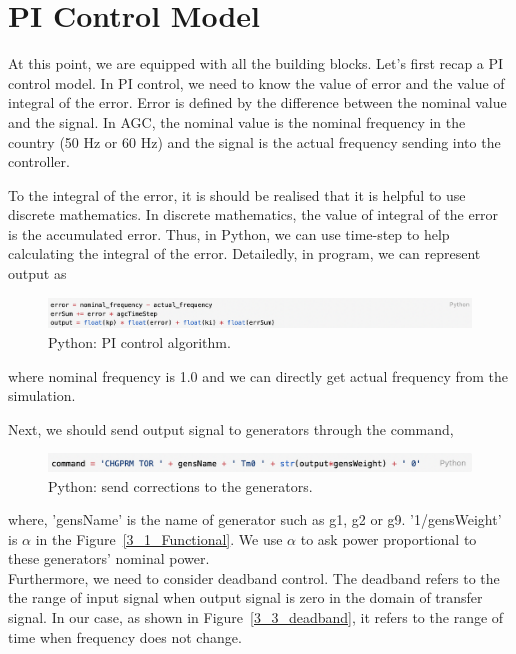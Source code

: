 \section{PI Control Model} %
At this point, we are equipped with all the building blocks. Let's first recap a PI control model. In PI control, we need to know the value of error and the value of integral of the error. Error is defined by the difference between the nominal value and the signal. In AGC, the nominal value is the nominal frequency in the country (50 Hz or 60 Hz) and the signal is the actual frequency sending into the controller. 

To the integral of the error,  it is should be realised that it is helpful to use discrete mathematics. In discrete mathematics, the value of integral of the error is the accumulated error. Thus, in Python, we can use time-step to help calculating the integral of the error.  Detailedly, in program, we can represent output as 

\begin{figure}[!htbp]
\center
\includegraphics[scale=0.5]{figure/3_3_code1.png}
\caption{Python: PI control algorithm.}
\label{3_3_code1}
\end{figure}

where nominal frequency is 1.0 and we can directly get actual frequency from the simulation. 

Next, we should send output signal to generators through the command, 

\begin{figure}[!htbp]
\center
\includegraphics[scale=0.65]{figure/3_3_code2.png}
\caption{Python: send corrections to the generators.}
\label{3_3_code2}
\end{figure}

where, 'gensName' is the name of generator such as g1, g2 or g9. '1/gensWeight' is $\alpha$ in the Figure~\ref{3_1_Functional}. We use $\alpha$ to ask power proportional to these generators' nominal power.\\

Furthermore, we need to consider deadband control. The deadband refers to the the range of input signal when output signal is zero in the domain of transfer signal. In our case, as shown in Figure~\ref{3_3_deadband}, it refers to the range of time when frequency does not change.  

